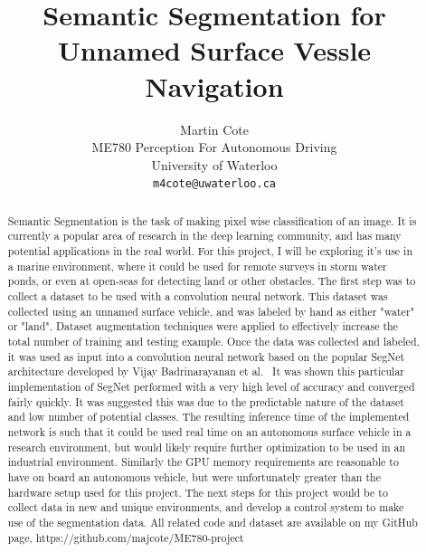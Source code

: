 \documentclass[10pt,twocolumn,letterpaper]{article}
\begin{document}
\title{ Semantic Segmentation for Unnamed Surface Vessle Navigation}

\author{Martin Cote\\
ME780 Perception For Autonomous Driving\\
University of Waterloo\\
{\tt\small m4cote@uwaterloo.ca}
}

\maketitle

\begin{abstract}
 Semantic Segmentation is the task of making pixel wise classification of an image. It is currently a popular area of research in the deep learning community, and has many potential applications in the real world. For this project, I will be exploring it's use in a marine environment, where it could be used for remote surveys in storm water ponds, or even at open-seas for detecting land or other obstacles. The first step was to collect a dataset to be used with a convolution neural network. This dataset was collected using an unnamed surface vehicle, and was labeled by hand as either "water" or "land". Dataset augmentation techniques were applied to effectively increase the total number of training and testing example. Once the data was collected and labeled, it was used as input into a convolution neural network based on the popular SegNet architecture developed by Vijay Badrinarayanan et al.~\cite{DBLP:journals/corr/BadrinarayananK15} It was shown this particular implementation of SegNet performed with a very high level of accuracy and converged fairly quickly. It was suggested this was due to the predictable nature of the dataset and low number of potential classes. The resulting inference time of the implemented network is such that it could be used real time on an autonomous surface vehicle in a research environment, but would likely require further optimization to be used in an industrial environment. Similarly the GPU memory requirements are reasonable to have on board an autonomous vehicle, but were unfortunately greater than the hardware setup used for this project. The next steps for this project would be to collect data in new and unique environments, and develop a control system to make use of the segmentation data. All related code and dataset are available on my GitHub page, https://github.com/majcote/ME780-project
\end{abstract}
\end{document}
